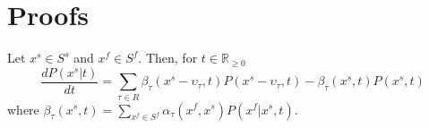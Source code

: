 \documentclass{llncs}
\begin{document}
\vspace{-1.2em}

 
 {\tiny}

\appendix

\section{Proofs}
\addtocounter{proposition}{-1}
\addtocounter{lemma}{-1}
\addtocounter{theorem}{-2}

\begin{proposition}
Let $x^s \in S^s$ and $x^f \in S^f$. Then, for $t \in \mathbb{R}_{\geq 0}$
\begin{equation*}
\frac{d P(x^s|t)}{dt}=\sum_{\tau \in R}\beta_{\tau}(x^s-\upsilon_{\tau},t)P(x^s-\upsilon_{\tau},t)- \beta_{\tau}(x^s,t)P(x^s,t)
\end{equation*}
where $\beta_{\tau}(x^s,t)= \sum_{x^f \in S^f} \alpha_{\tau}(x^f,x^s)P(x^f|x^s,t)$. 
\end{proposition}
\end{document}
